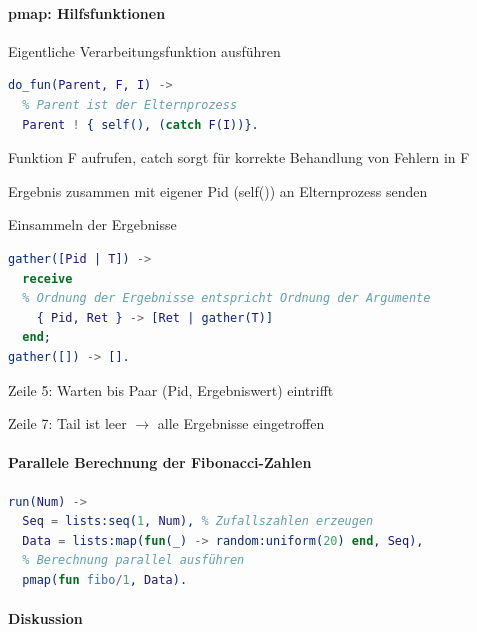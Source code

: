 \documentclass[10pt]{article}
\begin{document}
\paragraph{pmap: Hilfsfunktionen}

\color{orange} Eigentliche Verarbeitungsfunktion ausführen \color{black}
\begin{lstlisting}[language=erlang]
do_fun(Parent, F, I) ->
  % Parent ist der Elternprozess
  Parent ! { self(), (catch F(I))}.
\end{lstlisting}
\begin{itemize*}
  \item Funktion F aufrufen, catch sorgt für korrekte Behandlung von Fehlern in F
  \item Ergebnis zusammen mit eigener Pid (self()) an Elternprozess senden
\end{itemize*}

\color{orange} Einsammeln der Ergebnisse \color{black}
\begin{lstlisting}[language=erlang]
gather([Pid | T]) ->
  receive
  % Ordnung der Ergebnisse entspricht Ordnung der Argumente
    { Pid, Ret } -> [Ret | gather(T)]
  end;
gather([]) -> [].
\end{lstlisting}
\begin{itemize*}
  \item Zeile 5: Warten bis Paar (Pid, Ergebniswert) eintrifft
  \item Zeile 7: Tail ist leer $\rightarrow$ alle Ergebnisse eingetroffen
\end{itemize*}

\paragraph{Parallele Berechnung der Fibonacci-Zahlen}
\begin{lstlisting}[language=erlang]
%Liste von Num Fibonacci Zahlen
run(Num) ->
  Seq = lists:seq(1, Num), % Zufallszahlen erzeugen
  Data = lists:map(fun(_) -> random:uniform(20) end, Seq),
  % Berechnung parallel ausführen
  pmap(fun fibo/1, Data).
\end{lstlisting}

\paragraph{Diskussion}
\end{document}
